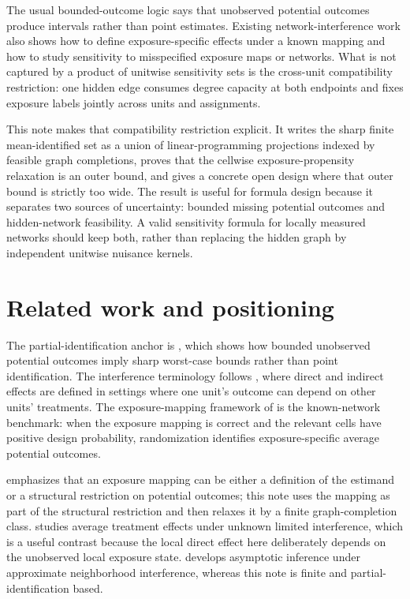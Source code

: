 \documentclass[11pt]{article}
\theoremstyle{definition}
\theoremstyle{plain}
\theoremstyle{remark}
\begin{document}
The usual bounded-outcome logic says that unobserved potential outcomes produce
intervals rather than point estimates.  Existing network-interference work also
shows how to define exposure-specific effects under a known mapping and how to
study sensitivity to misspecified exposure maps or networks.  What is not
captured by a product of unitwise sensitivity sets is the cross-unit
compatibility restriction: one hidden edge consumes degree capacity at both
endpoints and fixes exposure labels jointly across units and assignments.

This note makes that compatibility restriction explicit.  It writes the sharp
finite mean-identified set as a union of linear-programming projections indexed
by feasible graph completions, proves that the cellwise exposure-propensity
relaxation is an outer bound, and gives a concrete open design where that outer
bound is strictly too wide.  The result is useful for formula design because it
separates two sources of uncertainty: bounded missing potential outcomes and
hidden-network feasibility.  A valid sensitivity formula for locally measured
networks should keep both, rather than replacing the hidden graph by independent
unitwise nuisance kernels.

\section{Related work and positioning}
The partial-identification anchor is \cite{Manski1990}, which shows how bounded
unobserved potential outcomes imply sharp worst-case bounds rather than point
identification.  The interference terminology follows \cite{HudgensHalloran2008},
where direct and indirect effects are defined in settings where one unit's
outcome can depend on other units' treatments.  The exposure-mapping framework
of \cite{AronowSamii2017} is the known-network benchmark: when the exposure
mapping is correct and the relevant cells have positive design probability,
randomization identifies exposure-specific average potential outcomes.

\cite{Savje2024} emphasizes that an exposure mapping can be either a definition
of the estimand or a structural restriction on potential outcomes; this note
uses the mapping as part of the structural restriction and then relaxes it by a
finite graph-completion class.  \cite{SavjeAronowHudgens2021} studies average
treatment effects under unknown limited interference, which is a useful
contrast because the local direct effect here deliberately depends on the
unobserved local exposure state.  \cite{Leung2022} develops asymptotic inference
under approximate neighborhood interference, whereas this note is finite and
partial-identification based.
\end{document}
